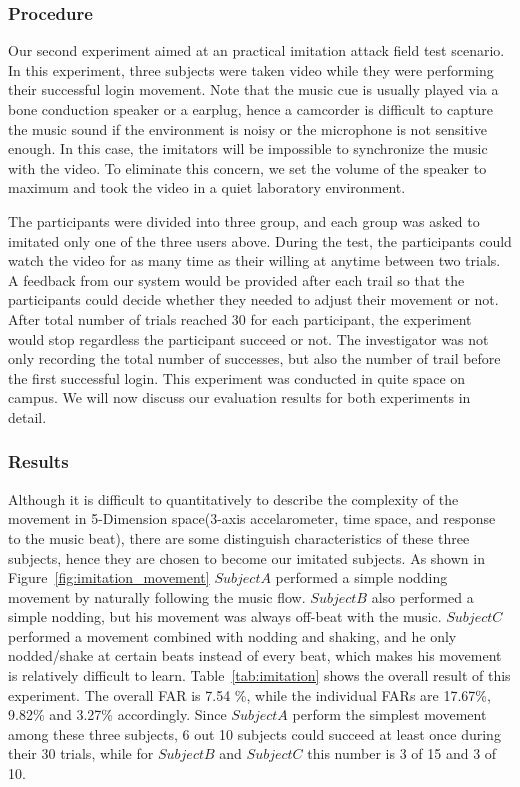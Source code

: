 \subsubsection{Procedure}
Our second experiment aimed at an practical imitation attack field test scenario. In this experiment, three subjects were taken video while they were performing their successful login movement. Note that the music cue is usually played via a bone conduction speaker or a earplug, hence a camcorder is difficult to capture the music sound if the environment is noisy or the microphone is not sensitive enough. In this case, the imitators will be impossible to synchronize the music with the video. To eliminate this concern, we set the volume of the speaker to maximum and took the video in a quiet laboratory environment. 

The participants were divided into three group, and each group was asked to imitated only one of the three users above. During the test, the participants could watch the video for as many time as their willing at anytime between two trials. A feedback from our system would be provided after each trail so that the participants could decide whether they needed to adjust their movement or not. After total number of trials reached 30 for each participant, the experiment would stop regardless the participant succeed or not. The investigator was not only recording the total number of successes, but also the number of trail before the first successful login. This experiment was conducted in quite space on campus. We will now discuss our evaluation results for both experiments in detail. 

\subsubsection{Results}
Although it is difficult to quantitatively to describe the complexity of the movement in 5-Dimension space(3-axis accelarometer, time space,  and response to the music beat), there are some distinguish characteristics of these three subjects, hence they are chosen to become our imitated subjects. As shown in Figure~\ref{fig:imitation_movement} $Subject A$ performed a simple nodding movement by naturally following the music flow. $Subject B$ also performed a simple nodding, but his movement was always off-beat with the music. $Subject C$ performed a movement combined with nodding and shaking, and he only nodded/shake at certain beats instead of every beat, which makes his movement is relatively difficult to learn. Table~\ref{tab:imitation} shows the overall result of this experiment. The overall FAR is 7.54 \%, while the individual FARs are 17.67\%, 9.82\% and 3.27\% accordingly.  Since $Subject A$ perform the simplest movement among these three subjects, 6 out 10 subjects could succeed at least once during their 30 trials, while for $Subject B$ and $Subject C$ this number is 3 of 15 and 3 of 10. 

